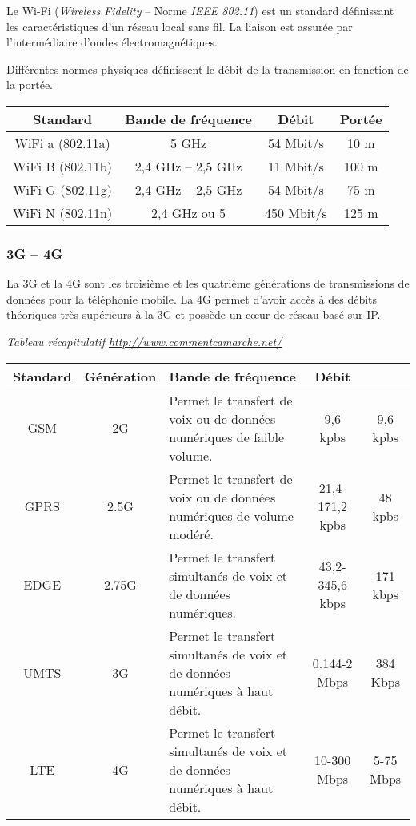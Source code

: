 Le Wi-Fi (\textit{Wireless Fidelity} -- Norme \textit{IEEE 802.11}) est un standard définissant les caractéristiques d'un réseau local sans fil. La liaison est assurée par l'intermédiaire d'ondes électromagnétiques.  

Différentes normes physiques définissent le débit de la transmission en fonction de la portée. 
\begin{center}
\begin{tabular}{|c|c|c|c|}
\hline
\textbf{Standard} & \textbf{Bande de fréquence} & \textbf{Débit} & \textbf{Portée} \\ \hline
WiFi a (802.11a) & 5 GHz & 54 Mbit/s & 10 m \\ \hline
WiFi B (802.11b) & 2,4 GHz -- 2,5 GHz& 11 Mbit/s & 100 m \\ \hline
WiFi G (802.11g) & 2,4 GHz -- 2,5 GHz & 54 Mbit/s & 75 m \\ \hline
WiFi N (802.11n) & 2,4 GHz ou 5 & 450 Mbit/s & 125 m \\ \hline
\end{tabular}
\end{center}


\subsubsection{3G -- 4G}
La 3G et la 4G sont les troisième et les quatrième générations de transmissions de données pour la téléphonie mobile. La 4G permet d'avoir accès à des débits théoriques très supérieurs à la 3G et possède un c\oe{}ur de réseau basé sur IP. 

\textit{Tableau récapitulatif \url{http://www.commentcamarche.net/}}
\begin{center}
\begin{tabular}{|c|c|p{6cm}|c|c|}
\hline
Standard	& Génération	&Bande de fréquence	& Débit & \\
\hline 
GSM	& 2G & Permet le transfert de voix ou de données numériques de faible volume.&	9,6 kpbs	&9,6  kpbs \\ \hline
GPRS &2.5G & Permet le transfert de voix ou de données numériques de volume modéré.&	21,4-171,2 kpbs	&48 kpbs \\ \hline
EDGE & 2.75G & 	Permet le transfert simultanés de voix et de données numériques.&	43,2-345,6 kbps&	171 kbps \\ \hline
UMTS & 3G &Permet le transfert simultanés de voix et de données numériques à haut débit.&	0.144-2 Mbps	&384 Kbps \\ \hline
LTE & 4G	& Permet le transfert simultanés de voix et de données numériques à haut débit.&	10-300 Mbps	&5-75 Mbps \\ \hline
\end{tabular}
\end{center}

